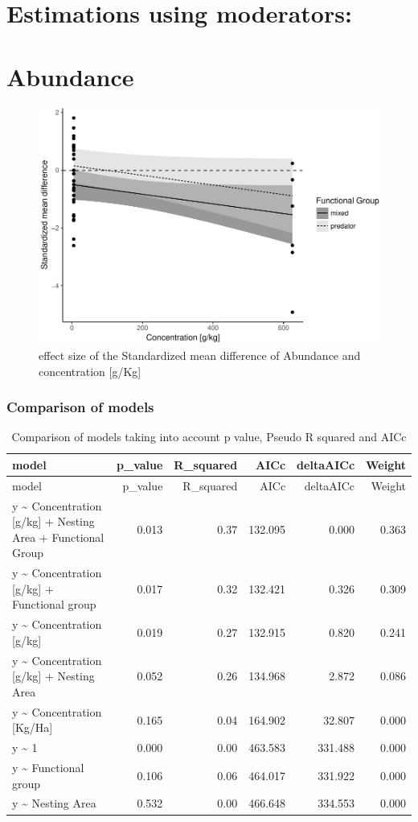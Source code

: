 \documentclass[]{elsarticle} %
\makeatletter
\def\maxwidth{\ifdim\Gin@nat@width>\linewidth\linewidth
\else\Gin@nat@width\fi}
\let\Oldincludegraphics\includegraphics
\renewcommand{\includegraphics}[1]{\Oldincludegraphics[width=\maxwidth]{#1}}
\makeatother
\begin{document}
\section{Estimations using
moderators:}\label{estimations-using-moderators}

\section{Abundance}\label{abundance}

\begin{figure}[htbp]
\centering
\includegraphics{MetanalysisNeonics_files/figure-latex/unnamed-chunk-10-1.pdf}
\caption{effect size of the Standardized mean difference of Abundance
and concentration {[}g/Kg{]}}
\end{figure}

\subsubsection{Comparison of models}\label{comparison-of-models}

\begin{longtable}[c]{@{}lrrrrr@{}}
\caption{Comparison of models taking into account p value, Pseudo R
squared and AICc}\tabularnewline
\toprule
model & p\_value & R\_squared & AICc & deltaAICc & Weight\tabularnewline
\midrule
\endfirsthead
\toprule
model & p\_value & R\_squared & AICc & deltaAICc & Weight\tabularnewline
\midrule
\endhead
y \textasciitilde{} Concentration {[}g/kg{]} + Nesting Area + Functional
Group & 0.013 & 0.37 & 132.095 & 0.000 & 0.363\tabularnewline
y \textasciitilde{} Concentration {[}g/kg{]} + Functional group & 0.017
& 0.32 & 132.421 & 0.326 & 0.309\tabularnewline
y \textasciitilde{} Concentration {[}g/kg{]} & 0.019 & 0.27 & 132.915 &
0.820 & 0.241\tabularnewline
y \textasciitilde{} Concentration {[}g/kg{]} + Nesting Area & 0.052 &
0.26 & 134.968 & 2.872 & 0.086\tabularnewline
y \textasciitilde{} Concentration {[}Kg/Ha{]} & 0.165 & 0.04 & 164.902 &
32.807 & 0.000\tabularnewline
y \textasciitilde{} 1 & 0.000 & 0.00 & 463.583 & 331.488 &
0.000\tabularnewline
y \textasciitilde{} Functional group & 0.106 & 0.06 & 464.017 & 331.922
& 0.000\tabularnewline
y \textasciitilde{} Nesting Area & 0.532 & 0.00 & 466.648 & 334.553 &
0.000\tabularnewline
\bottomrule
\end{longtable}
\end{document}
